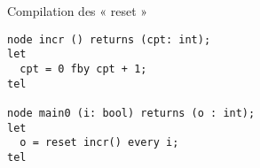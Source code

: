 \documentclass{beamer}
\begin{document}

\begin{frame}[fragile]{Compilation des « reset »}

\begin{lstlisting}
node incr () returns (cpt: int);
let
  cpt = 0 fby cpt + 1;
tel

node main0 (i: bool) returns (o : int);
let
  o = reset incr() every i;
tel
\end{lstlisting}

\end{frame}



\end{document}
